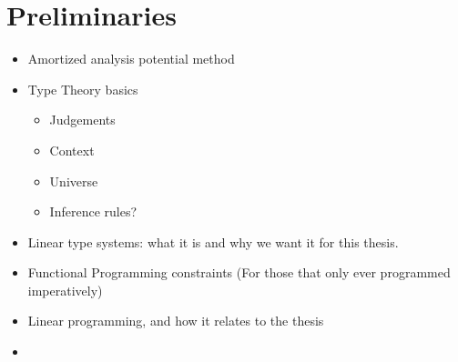 \chapter{Preliminaries} \label{chap:preliminaries}

\begin{itemize}
	\item Amortized analysis potential method
	\item Type Theory basics
	   \begin{itemize}
		\item Judgements 
		\item Context
		\item Universe
		\item Inference rules?
	   \end{itemize}
   \item Linear type systems: what it is and why we want it for this thesis.
   \item Functional Programming constraints (For those that only ever programmed imperatively)
   \item Linear programming, and how it relates to the thesis
   \item 
\end{itemize}


